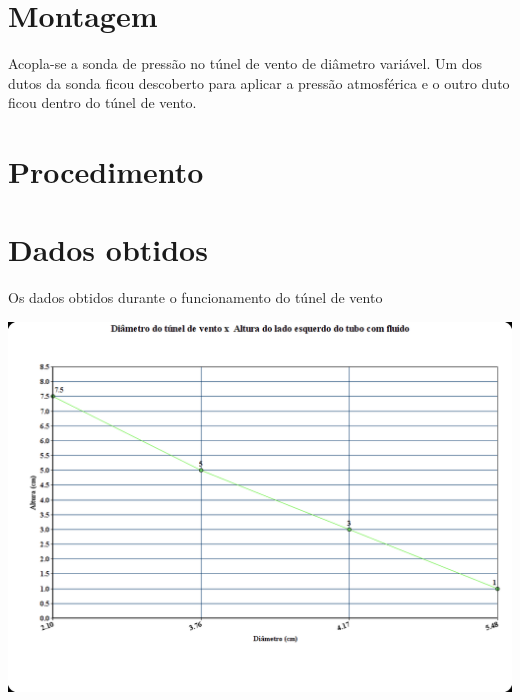 \documentclass[a4paper]{article}
\begin{document}
\section{Montagem}
    Acopla-se a sonda de pressão no túnel de vento de diâmetro variável. Um dos dutos da sonda ficou descoberto para aplicar a pressão atmosférica e o outro duto ficou dentro do túnel de vento.

\section{Procedimento}

\section{Dados obtidos}
    Os dados obtidos durante o funcionamento do túnel de vento
    \begin{center}
          \includegraphics[width=\linewidth]{img/graphHeight.png}
          \label{graph}
    \end{center}
\end{document}
